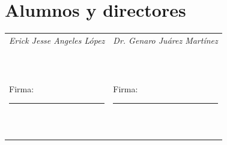 \documentclass[letterpaper,10pt,oneside]{article}
\begin{document}
	\section{Alumnos y directores}
	
\begin{tabular}{@{} p{} p{} @{}}
	\textit{Erick Jesse Angeles López}
	&
	\textit{Dr. Genaro Juárez Martínez}
	
	 \\ & \\ & \\
	 & \\ & \\
	 
	 & \\ & \\
	 & \\ & \\
	
	Firma:
	\rule{6cm}{0.4pt} & 
	
	Firma:
	\rule{6cm}{0.4pt} \\
	
	& \\ & \\
	& \\ & \\
	& \\ & \\
	& \\ & \\
\end{tabular}
\end{document}
